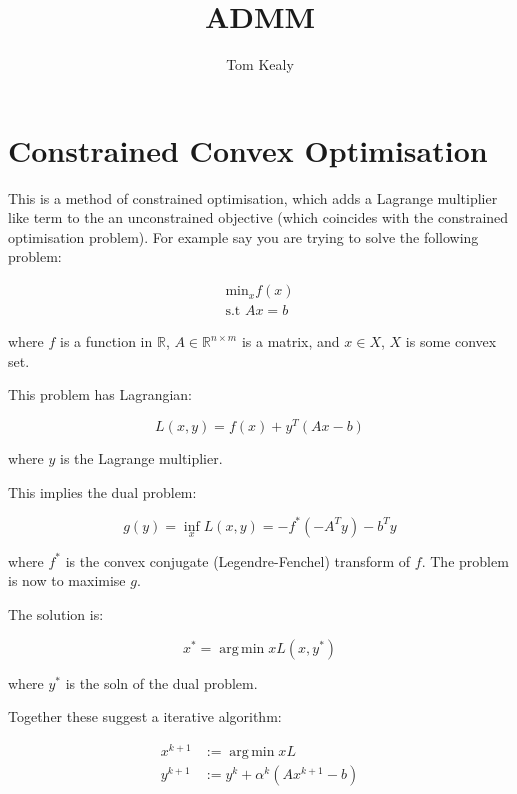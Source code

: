 \documentclass{article}
\DeclareMathOperator*{\argmin}{arg\,min}
\newcommand{\re}{{\mathbb{R}}}
\begin{document}
\title{ADMM}
\author{Tom Kealy}



\maketitle

\section{Constrained Convex Optimisation}

This is a method of constrained optimisation, which adds a Lagrange multiplier like term to the an unconstrained objective (which coincides with the constrained optimisation problem). For example say you are trying to solve the following problem:

\begin{align}
\text{min}_{x} f\left( x \right)
\\
\text{s.t } Ax = b
\label{orig_problem}
\end{align}

where \(f\) is a function in \(\re\), \(A \in \re^{n \times m}\) is a matrix, and \(x\in X\), \(X\) is some convex set.

This problem has Lagrangian:

\begin{equation}
L\left(x,y\right) = f\left( x \right) + y^T\left(Ax-b\right)
\end{equation}

where \(y\) is the Lagrange multiplier.

This implies the dual problem:

\begin{equation}
g\left(y\right) = \inf_x L\left(x,y\right) = -f^*\left(-A^Ty\right) -b^Ty
\end{equation}

where \(f^*\) is the convex conjugate (Legendre-Fenchel) transform of \(f\). The problem is now to maximise \(g\). 

The solution is:

\begin{equation}
x^* = \argmin{x} L\left(x, y^*\right) 
\end{equation}

where \(y^*\) is the soln of the dual problem. 

Together these suggest a iterative algorithm:

\begin{align}
x^{k+1} &:= \argmin{x} L \\
y^{k+1} &:= y^{k} + \alpha^k \left(Ax^{k+1} - b\right)
\label{gradient_ascent}
\end{align}
\end{document}
